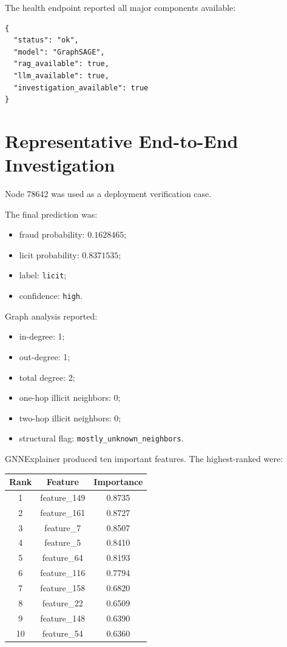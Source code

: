 \documentclass[11pt,a4paper]{article}
\begin{document}
The health endpoint reported all major components available:
\begin{lstlisting}
{
  "status": "ok",
  "model": "GraphSAGE",
  "rag_available": true,
  "llm_available": true,
  "investigation_available": true
}
\end{lstlisting}

\section{Representative End-to-End Investigation}
Node 78642 was used as a deployment verification case.

The final prediction was:
\begin{itemize}
\item fraud probability: $0.1628465$;
\item licit probability: $0.8371535$;
\item label: \texttt{licit};
\item confidence: \texttt{high}.
\end{itemize}

Graph analysis reported:
\begin{itemize}
\item in-degree: 1;
\item out-degree: 1;
\item total degree: 2;
\item one-hop illicit neighbors: 0;
\item two-hop illicit neighbors: 0;
\item structural flag: \texttt{mostly\_unknown\_neighbors}.
\end{itemize}

GNNExplainer produced ten important features. The highest-ranked were:
\begin{longtable}{ccc}
\toprule
Rank & Feature & Importance\\
\midrule
1 & feature\_149 & 0.8735\\
2 & feature\_161 & 0.8727\\
3 & feature\_7 & 0.8507\\
4 & feature\_5 & 0.8410\\
5 & feature\_64 & 0.8193\\
6 & feature\_116 & 0.7794\\
7 & feature\_158 & 0.6820\\
8 & feature\_22 & 0.6509\\
9 & feature\_148 & 0.6390\\
10 & feature\_54 & 0.6360\\
\bottomrule
\end{longtable}
\end{document}
